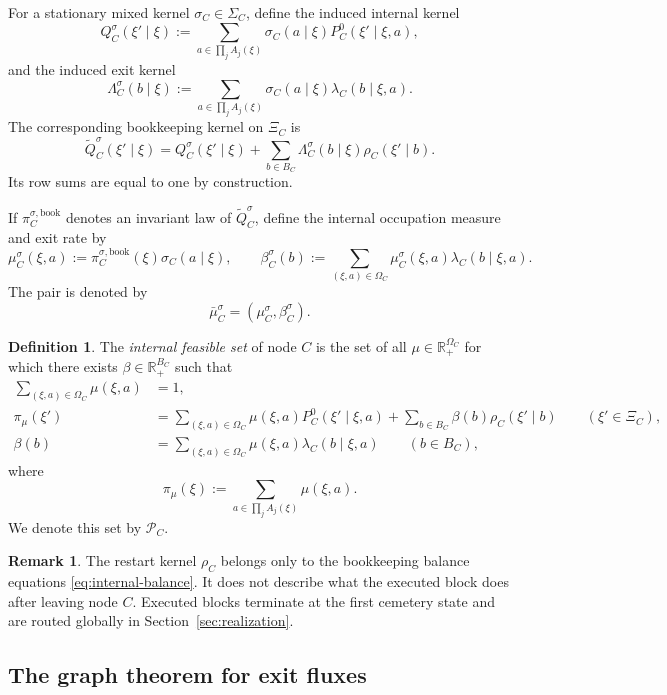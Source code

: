 \documentclass[12pt]{article}
\theoremstyle{definition}
\newtheorem{definition}[theorem]{Definition}
\newtheorem{remark}[theorem]{Remark}
\newcommand{\R}{\mathbb{R}}
\newcommand{\1}{\mathbf{1}}
\newcommand{\cP}{\mathcal{P}}
\begin{document}
For a stationary mixed kernel $\sigma_C\in\Sigma_C$, define the induced internal
kernel
\[
Q_C^{\sigma}(\xi'\mid \xi)
:=
\sum_{a\in\prod_j A_j(\xi)} \sigma_C(a\mid \xi)
P_C^0(\xi'\mid \xi,a),
\]
and the induced exit kernel
\[
\Lambda_C^{\sigma}(b\mid\xi)
:=
\sum_{a\in\prod_j A_j(\xi)}\sigma_C(a\mid\xi)\lambda_C(b\mid\xi,a).
\]
The corresponding bookkeeping kernel on $\Xi_C$ is
\begin{equation}
\label{eq:bookkeeping-kernel}
\widetilde Q_C^{\sigma}(\xi'\mid \xi)
=
Q_C^{\sigma}(\xi'\mid \xi)
+
\sum_{b\in B_C}\Lambda_C^{\sigma}(b\mid \xi)\rho_C(\xi'\mid b).
\end{equation}
Its row sums are equal to one by construction.

If $\pi_C^{\sigma,\mathrm{book}}$ denotes an invariant law of
$\widetilde Q_C^{\sigma}$, define the internal occupation measure and exit rate by
\[
\mu_C^{\sigma}(\xi,a):=\pi_C^{\sigma,\mathrm{book}}(\xi)\sigma_C(a\mid\xi),
\qquad
\beta_C^{\sigma}(b):=\sum_{(\xi,a)\in\Omega_C}
\mu_C^{\sigma}(\xi,a)\lambda_C(b\mid\xi,a).
\]
The pair is denoted by
\[
\bar\mu_C^{\sigma}=(\mu_C^{\sigma},\beta_C^{\sigma}).
\]


\begin{definition}
\label{def:PC}
The \emph{internal feasible set} of node $C$ is the set of all
$\mu\in\R_+^{\Omega_C}$ for which there exists $\beta\in\R_+^{B_C}$ such that
\begin{align}
\sum_{(\xi,a)\in\Omega_C}\mu(\xi,a)&=1,
\label{eq:norm-PC}
\\
\pi_\mu(\xi')
&=
\sum_{(\xi,a)\in\Omega_C}\mu(\xi,a)P_C^0(\xi'\mid\xi,a)
+
\sum_{b\in B_C}\beta(b)\rho_C(\xi'\mid b)
\qquad (\xi'\in\Xi_C),
\label{eq:internal-balance}
\\
\beta(b)
&=
\sum_{(\xi,a)\in\Omega_C}\mu(\xi,a)\lambda_C(b\mid\xi,a)
\qquad (b\in B_C),
\label{eq:beta-balance}
\end{align}
where
\[
\pi_\mu(\xi):=\sum_{a\in\prod_j A_j(\xi)}\mu(\xi,a).
\]
We denote this set by $\cP_C$.
\end{definition}


\begin{remark}
The restart kernel $\rho_C$ belongs only to the bookkeeping balance equations
\eqref{eq:internal-balance}. It does not describe what the executed block does
after leaving node $C$. Executed blocks terminate at the first cemetery state and
are routed globally in Section~\ref{sec:realization}.
\end{remark}

\subsection{The graph theorem for exit fluxes}
\end{document}
